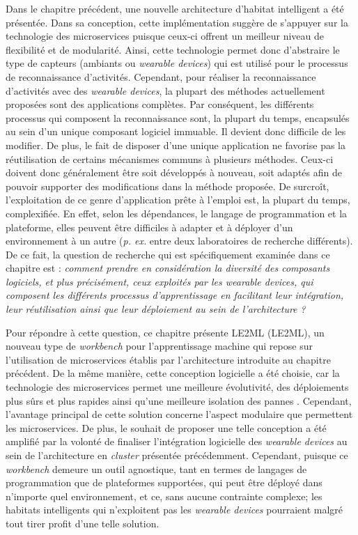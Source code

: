 Dans le chapitre précédent, une nouvelle architecture d'habitat intelligent a été présentée. Dans sa conception, cette implémentation suggère de s'appuyer sur la technologie des microservices puisque ceux-ci offrent un meilleur niveau de flexibilité et de modularité. Ainsi, cette technologie permet donc d'abstraire le type de capteurs (ambiants ou \textit{wearable devices}) qui est utilisé pour le processus de reconnaissance d'activités. Cependant, pour réaliser la reconnaissance d'activités avec des \textit{wearable devices}, la plupart des méthodes actuellement proposées sont des applications complètes. Par conséquent, les différents processus qui composent la reconnaissance sont, la plupart du temps, encapsulés au sein d'un unique composant logiciel immuable. Il devient donc difficile de les modifier. De plus, le fait de disposer d'une unique application ne favorise pas la réutilisation de certains mécanismes communs à plusieurs méthodes. Ceux-ci doivent donc généralement être soit développés à nouveau, soit adaptés afin de pouvoir supporter des modifications dans la méthode proposée. De surcroît, l'exploitation de ce genre d'application \og prête à l'emploi \fg est, la plupart du temps, complexifiée. En effet, selon les dépendances, le langage de programmation et la plateforme, elles peuvent être difficiles à adapter et à déployer d'un environnement à un autre (\textit{p. ex.} entre deux laboratoires de recherche différents). De ce fait, la question de recherche qui est spécifiquement examinée dans ce chapitre est : \textit{\og comment prendre en considération la diversité des composants logiciels, et plus précisément, ceux exploités par les \textit{wearable devices}, qui composent les différents processus d'apprentissage en facilitant leur intégration, leur réutilisation ainsi que leur déploiement au sein de l'architecture ? \fg}

Pour répondre à cette question, ce chapitre présente \acs{LE2ML} (\acl{LE2ML}), un nouveau type de \textit{workbench} pour l'apprentissage machine qui repose sur l'utilisation de microservices établis par l'architecture introduite au chapitre précédent. De la même manière, cette conception logicielle a été choisie, car la technologie des microservices permet une meilleure évolutivité, des déploiements plus sûrs et plus rapides ainsi qu'une meilleure isolation des pannes \citep{Dragoni2017}. Cependant, l'avantage principal de cette solution concerne l'aspect modulaire que permettent les microservices. De plus, le souhait de proposer une telle conception a été amplifié par la volonté de finaliser l'intégration logicielle des \textit{wearable devices} au sein de l'architecture en \textit{cluster} présentée précédemment. Cependant, puisque ce \textit{workbench} demeure un outil agnostique, tant en termes de langages de programmation que de plateformes supportées, qui peut être déployé dans n'importe quel environnement, et ce, sans aucune contrainte complexe; les habitats intelligents qui n'exploitent pas les \textit{wearable devices} pourraient malgré tout tirer profit d'une telle solution.

